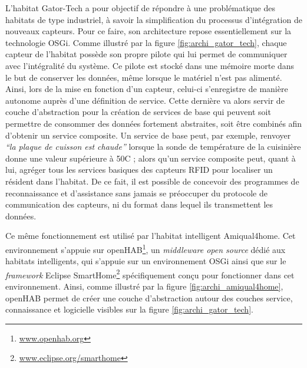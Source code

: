 L'habitat Gator-Tech a pour objectif de répondre à une problématique des habitats de type industriel, à savoir la simplification du processus d'intégration de nouveaux capteurs. Pour ce faire, son architecture repose essentiellement sur la technologie \acs{OSGi}. Comme illustré par la figure \ref{fig:archi_gator_tech}, chaque capteur de l'habitat possède son propre pilote qui lui permet de communiquer avec l'intégralité du système. Ce pilote est stocké dans une mémoire morte dans le but de conserver les données, même lorsque le matériel n'est pas alimenté. Ainsi, lors de la mise en fonction d'un capteur, celui-ci s'enregistre de manière autonome auprès d'une définition de service. Cette dernière va alors servir de couche d'abstraction pour la création de services de base qui peuvent soit permettre de consommer des données fortement abstraites, soit être combinés afin d'obtenir un service composite. Un service de base peut, par exemple, renvoyer \textit{``la plaque de cuisson est chaude''} lorsque la sonde de température de la cuisinière donne une valeur supérieure à 50\textdegree{}C ; alors qu'un service composite peut, quant à lui, agréger tous les services basiques des capteurs \ac{RFID} pour localiser un résident dans l'habitat. De ce fait, il est possible de concevoir des programmes de reconnaissance et d'assistance sans jamais se préoccuper du protocole de communication des capteurs, ni du format dans lequel ils transmettent les données.

Ce même fonctionnement est utilisé par l'habitat intelligent Amiqual4home. Cet environnement s'appuie sur \ac{openHAB}\footnote{\url{www.openhab.org}}, un \textit{middleware open source} dédié aux habitats intelligents, qui s'appuie sur un environnement \acs{OSGi} ainsi que sur le \textit{framework} Eclipse SmartHome\footnote{\url{www.eclipse.org/smarthome}} spécifiquement conçu pour fonctionner dans cet environnement. Ainsi, comme illustré par la figure \ref{fig:archi_amiqual4home}, \acs{openHAB} permet de créer une couche d'abstraction autour des couches service, connaissance et logicielle visibles sur la figure \ref{fig:archi_gator_tech}.

